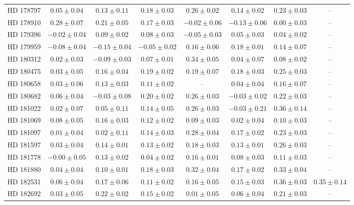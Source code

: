\begin{table*}
\begin{tabular}{cccccccc}
HD 178797 & $0.05 \pm 0.04$ & $0.13 \pm 0.11$ & $0.18 \pm 0.03$ & $0.26 \pm 0.02$ & $0.14 \pm 0.02$ & $0.23 \pm 0.03$ & -- \\
HD 178910 & $0.28 \pm 0.07$ & $0.21 \pm 0.05$ & $0.17 \pm 0.03$ & $-0.02 \pm 0.06$ & $-0.13 \pm 0.06$ & $0.00 \pm 0.03$ & -- \\
HD 179396 & $-0.02 \pm 0.04$ & $0.09 \pm 0.02$ & $0.08 \pm 0.03$ & $-0.05 \pm 0.03$ & $0.05 \pm 0.03$ & $0.04 \pm 0.02$ & -- \\
HD 179959 & $-0.08 \pm 0.04$ & $-0.15 \pm 0.04$ & $-0.05 \pm 0.02$ & $0.16 \pm 0.06$ & $0.18 \pm 0.01$ & $0.14 \pm 0.07$ & -- \\
HD 180312 & $0.02 \pm 0.03$ & $-0.09 \pm 0.03$ & $0.07 \pm 0.01$ & $0.34 \pm 0.05$ & $0.04 \pm 0.07$ & $0.08 \pm 0.02$ & -- \\
HD 180475 & $0.03 \pm 0.05$ & $0.16 \pm 0.04$ & $0.19 \pm 0.02$ & $0.19 \pm 0.07$ & $0.18 \pm 0.03$ & $0.25 \pm 0.03$ & -- \\
HD 180658 & $0.03 \pm 0.06$ & $0.13 \pm 0.03$ & $0.11 \pm 0.02$ & -- & $0.04 \pm 0.04$ & $0.16 \pm 0.07$ & -- \\
HD 180682 & $0.06 \pm 0.04$ & $-0.03 \pm 0.08$ & $0.20 \pm 0.02$ & $0.26 \pm 0.03$ & $-0.03 \pm 0.02$ & $0.22 \pm 0.03$ & -- \\
HD 181022 & $0.02 \pm 0.07$ & $0.05 \pm 0.11$ & $0.14 \pm 0.05$ & $0.26 \pm 0.03$ & $-0.03 \pm 0.21$ & $0.36 \pm 0.14$ & -- \\
HD 181069 & $0.08 \pm 0.05$ & $0.16 \pm 0.03$ & $0.12 \pm 0.02$ & $0.09 \pm 0.03$ & $0.02 \pm 0.04$ & $0.10 \pm 0.03$ & -- \\
HD 181097 & $0.01 \pm 0.04$ & $0.02 \pm 0.11$ & $0.14 \pm 0.03$ & $0.28 \pm 0.04$ & $0.17 \pm 0.02$ & $0.23 \pm 0.03$ & -- \\
HD 181597 & $0.03 \pm 0.04$ & $0.14 \pm 0.01$ & $0.13 \pm 0.02$ & $0.18 \pm 0.03$ & $0.13 \pm 0.01$ & $0.26 \pm 0.03$ & -- \\
HD 181778 & $-0.00 \pm 0.05$ & $0.13 \pm 0.02$ & $0.04 \pm 0.02$ & $0.16 \pm 0.01$ & $0.08 \pm 0.03$ & $0.11 \pm 0.03$ & -- \\
HD 181880 & $0.04 \pm 0.04$ & $0.10 \pm 0.01$ & $0.18 \pm 0.03$ & $0.32 \pm 0.04$ & $0.17 \pm 0.02$ & $0.33 \pm 0.04$ & -- \\
HD 182531 & $0.06 \pm 0.04$ & $0.17 \pm 0.06$ & $0.11 \pm 0.02$ & $0.16 \pm 0.05$ & $0.15 \pm 0.03$ & $0.36 \pm 0.03$ & $0.35 \pm 0.14$ \\
HD 182692 & $0.03 \pm 0.05$ & $0.22 \pm 0.02$ & $0.15 \pm 0.02$ & $0.01 \pm 0.05$ & $0.06 \pm 0.04$ & $0.21 \pm 0.03$ & -- \\

\end{tabular}
\end{table*}
